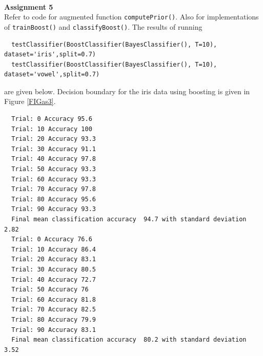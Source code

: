 \documentclass[a4paper,10pt]{article}
\begin{document}
$ $\\
\textbf{Assignment 5}
\\
Refer to code for augmented function \texttt{computePrior()}. Also for 
implementations of \texttt{trainBoost()} and \texttt{classifyBoost()}.
The results of running 
\begin{scriptsize}
  \begin{verbatim}
  testClassifier(BoostClassifier(BayesClassifier(), T=10), dataset='iris',split=0.7)
  testClassifier(BoostClassifier(BayesClassifier(), T=10), dataset='vowel',split=0.7)
  \end{verbatim}
\end{scriptsize}
are given below.
Decision boundary for the iris data using boosting is given in Figure \ref{FIGas3}.


\newpage
\begin{framed}
  \begin{scriptsize}
  \begin{verbatim}
  Trial: 0 Accuracy 95.6
  Trial: 10 Accuracy 100
  Trial: 20 Accuracy 93.3
  Trial: 30 Accuracy 91.1
  Trial: 40 Accuracy 97.8
  Trial: 50 Accuracy 93.3
  Trial: 60 Accuracy 93.3
  Trial: 70 Accuracy 97.8
  Trial: 80 Accuracy 95.6
  Trial: 90 Accuracy 93.3
  Final mean classification accuracy  94.7 with standard deviation 2.82
  Trial: 0 Accuracy 76.6
  Trial: 10 Accuracy 86.4
  Trial: 20 Accuracy 83.1
  Trial: 30 Accuracy 80.5
  Trial: 40 Accuracy 72.7
  Trial: 50 Accuracy 76
  Trial: 60 Accuracy 81.8
  Trial: 70 Accuracy 82.5
  Trial: 80 Accuracy 79.9
  Trial: 90 Accuracy 83.1
  Final mean classification accuracy  80.2 with standard deviation 3.52
  \end{verbatim}
  \end{scriptsize}
\end{framed}
\noindent
\end{document}
